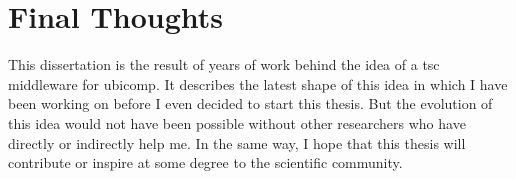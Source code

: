 \section{Final Thoughts}


This dissertation is the result of years of work behind the idea of a \acl{tsc} middleware for \acl{ubicomp}.
It describes the latest shape of this idea in which I have been working on before I even decided to start this thesis.
But the evolution of this idea would not have been possible without other researchers who have directly or indirectly help me. %
In the same way, I hope that this thesis will contribute or inspire at some degree to the scientific community.


